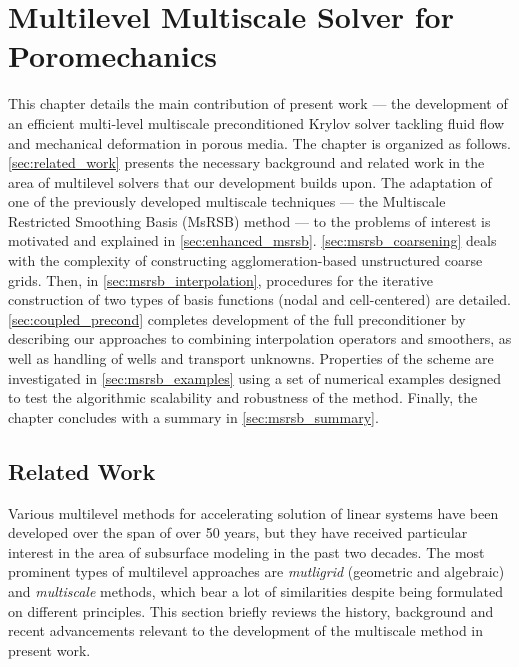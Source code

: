 \chapter{Multilevel Multiscale Solver for Poromechanics}
\label{ch:multiscale_poromechanics}

This chapter details the main contribution of present work --- the development of an efficient multi-level multiscale preconditioned Krylov solver tackling fluid flow and mechanical deformation in porous media. The chapter is organized as follows. \autoref{sec:related_work} presents the necessary background and related work in the area of multilevel solvers that our development builds upon. The adaptation of one of the previously developed multiscale techniques --- the Multiscale Restricted Smoothing Basis (MsRSB) method --- to the problems of interest is motivated and explained in \autoref{sec:enhanced_msrsb}.   \autoref{sec:msrsb_coarsening} deals with the complexity of constructing agglomeration-based unstructured coarse grids.   Then, in \autoref{sec:msrsb_interpolation}, procedures for the iterative construction of two types of basis functions (nodal and cell-centered) are detailed.   \autoref{sec:coupled_precond} completes development of the full preconditioner by describing our approaches to combining interpolation operators and smoothers, as well as handling of wells and transport unknowns.   Properties of the scheme are investigated in \autoref{sec:msrsb_examples} using a set of numerical examples designed to test the algorithmic scalability and robustness of the method.   Finally, the chapter concludes with a summary in \autoref{sec:msrsb_summary}.

\section{Related Work}
\label{sec:related_work}

Various multilevel methods for accelerating solution of linear systems have been developed over the span of over 50 years, but they have received particular interest in the area of subsurface modeling in the past two decades.    The most prominent types of multilevel approaches are \textit{mutligrid} (geometric and algebraic) and \textit{multiscale} methods, which bear a lot of similarities despite being formulated on different principles.    This section briefly reviews the history, background and recent advancements relevant to the development of the multiscale method in present work.

